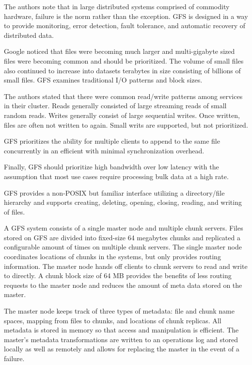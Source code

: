 \documentclass[]{article}
\begin{document}
The authors note that in large distributed systems comprised of commodity hardware, failure is the norm rather than the exception. GFS is designed in a way to provide monitoring, error detection, fault tolerance, and automatic recovery of distributed data. 

Google noticed that files were becoming much larger and multi-gigabyte sized files were becoming common and should be prioritized. The volume of small files also continued to increase into datasets terabytes in size consisting of billions of small files. GFS examines traditional I/O patterns and block sizes.

The authors stated that there were common read/write patterns among services in their cluster. Reads generally consisted of large streaming reads of small random reads. Writes generally consist of large sequential writes. Once written, files are often not written to again. Small writs are supported, but not prioritized. 

GFS prioritizes the ability for multiple clients to append to the same file concurrently in an efficient with minimal synchronization overhead.

Finally, GFS should prioritize high bandwidth over low latency with the assumption that most use cases require processing bulk data at a high rate.

GFS provides a non-POSIX but familiar interface utilizing a directory/file hierarchy and supports creating, deleting, opening, closing, reading, and writing of files.

A GFS system consists of a single master node and multiple chunk servers. Files stored on GFS are divided into fixed-size 64 megabytes chunks and replicated a configurable amount of times on multiple chunk servers. The single master node coordinates locations of chunks in the systems, but only provides routing information. The master node hands off clients to chunk servers to read and write to directly. A chunk block size of 64 MB provides the benefits of less routing requests to the master node and reduces the amount of meta data stored on the master.

The master node keeps track of three types of metadata: file and chunk name spaces, mapping from files to chunks, and locations of chunk replicas. All metadata is stored in memory so that access and manipulation is efficient. The master's metadata transformations are written to an operations log and stored locally as well as remotely and allows for replacing the master in the event of a failure.
\end{document}
